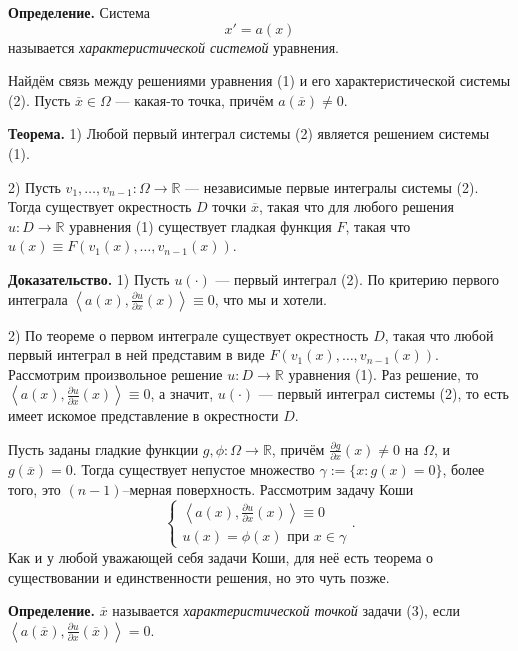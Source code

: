 \textbf{Определение.} Система
\begin{equation}
    x' = a(x)
\end{equation}
называется \textit{характеристической системой} уравнения.

Найдём связь между решениями уравнения (1) и его характеристической системы (2).
Пусть $\overline x \in \Omega$ --- какая-то точка, причём $a(\overline x) \ne 0$.

\textbf{Теорема.} 1) Любой первый интеграл системы (2) является решением системы (1).

2) Пусть $v_1, \dots, v_{n-1}: \Omega \to \mathbb R$ --- независимые первые интегралы системы (2).
Тогда существует окрестность $D$ точки $\overline x$, такая что для любого решения $u: D \to \mathbb R$ уравнения (1) существует гладкая функция $F$, такая что $u(x) \equiv F(v_1(x), \dots, v_{n-1}(x))$.

\textbf{Доказательство.} 1) Пусть $u(\cdot)$ --- первый интеграл (2).
По критерию первого интеграла $\left<a(x), \frac{\partial u}{\partial x}(x) \right> \equiv 0$, что мы и хотели.

2) По теореме о первом интеграле существует окрестность $D$, такая что любой первый интеграл в ней представим в виде $F(v_1(x), \dots, v_{n-1}(x))$.
Рассмотрим произвольное решение $u: D \to \mathbb R$ уравнения (1).
Раз решение, то $\left<a(x), \frac{\partial u}{\partial x}(x) \right> \equiv 0$, а значит, $u(\cdot)$ --- первый интеграл системы (2), то есть имеет искомое представление в окрестности $D$.

\QED

Пусть заданы гладкие функции $g, \phi: \Omega \to \mathbb R$, причём $\frac{\partial g}{\partial x}(x) \ne 0$ на $\Omega$, и $g(\overline x) = 0$.
Тогда существует непустое множество $\gamma := \{x: g(x) = 0\}$, более того, это $(n-1)$--мерная поверхность.
Рассмотрим задачу Коши
\begin{equation}
    \begin{cases}
        \left<a(x), \frac{\partial u}{\partial x}(x) \right> \equiv 0 \\
        u(x) = \phi(x) \text{ при $x \in \gamma$}
    \end{cases}.
\end{equation}
Как и у любой уважающей себя задачи Коши, для неё есть теорема о существовании и единственности решения, но это чуть позже.

\textbf{Определение.} $\overline x$ называется \textit{характеристической точкой} задачи (3), если $\left<a(\overline x), \frac{\partial u}{\partial x}(\overline x) \right> = 0$.

